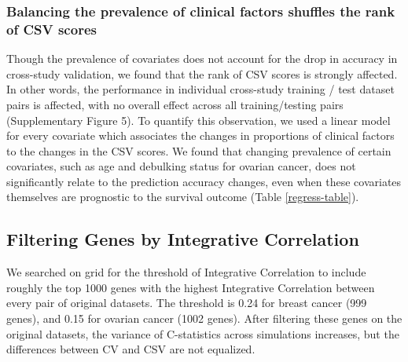 \documentclass{bioinfo}
\begin{document}
  \subsubsection{Balancing the prevalence of clinical factors shuffles the rank of CSV scores}
  Though the prevalence of covariates does not account for the drop in accuracy in cross-study
  validation, we found that the rank of CSV scores is strongly affected. In other words, 
  the performance in individual cross-study training / test dataset pairs 
  is affected, with no overall effect across all training/testing pairs 
  (Supplementary Figure 5). To quantify this observation,
  we used a linear model for every covariate which associates the changes in proportions of 
  clinical factors to the changes in the CSV scores. We found that changing prevalence of  
  certain covariates, such as age and debulking status for ovarian cancer, does not significantly relate
  to the prediction accuracy changes, even when these covariates themselves are prognostic to the survival outcome (Table \ref{regress-table}).
  
  	

 
  \subsection{Filtering Genes by Integrative Correlation}
  We searched on grid for the threshold of Integrative Correlation \citep{Parmigiani2004, Garrett-Mayer2008} to include roughly the top 1000 genes with the highest Integrative Correlation between every pair of original datasets. The threshold is 0.24 for breast cancer (999 genes), and 0.15 for ovarian cancer (1002 genes). After filtering these genes on the original datasets, the variance of C-statistics across simulations increases, but the differences between CV and CSV are not equalized. 
  
\end{document}
